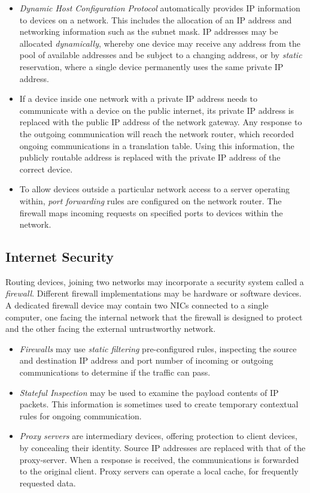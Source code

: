 \documentclass[10pt]{article}
\begin{document}
\begin{itemize}
\item \emph{Dynamic Host Configuration Protocol} automatically provides IP information to devices on a network. This includes the allocation of an IP address and networking information such as the subnet mask. IP addresses may be allocated \emph{dynamically}, whereby one device may receive any address from the pool of available addresses and be subject to a changing address, or by \emph{static} reservation, where a single device permanently uses the same private IP address.

\item If a device inside one network with a private IP address needs to communicate with a device on the public internet, its private IP address is replaced with the public IP address of the network gateway. Any response to the outgoing communication will reach the network router, which recorded ongoing communications in a translation table. Using this information, the publicly routable address is replaced with the private IP address of the correct device.

\item To allow devices outside a particular network access to a server operating within, \emph{port forwarding} rules are configured on the network router. The firewall maps incoming requests on specified ports to devices within the network.
\end{itemize}

\subsection{Internet Security}
\label{sec:org7969b2f}

Routing devices, joining two networks may incorporate a security system called a \emph{firewall}. Different firewall implementations may be hardware or software devices. A dedicated firewall device may contain two NICs connected to a single computer, one facing the internal network that the firewall is designed to protect and the other facing the external untrustworthy network.

\begin{itemize}
\item \emph{Firewalls} may use \emph{static filtering} pre-configured rules, inspecting the source and destination IP address and port number of incoming or outgoing communications to determine if the traffic can pass.

\item \emph{Stateful Inspection} may be used to examine the payload contents of IP packets. This information is sometimes used to create temporary contextual rules for ongoing communication.

\item \emph{Proxy servers} are intermediary devices, offering protection to client devices, by concealing their identity. Source IP addresses are replaced with that of the proxy-server. When a response is received, the communications is forwarded to the original client. Proxy servers can operate a local cache, for frequently requested data.
\end{itemize}
\end{document}
